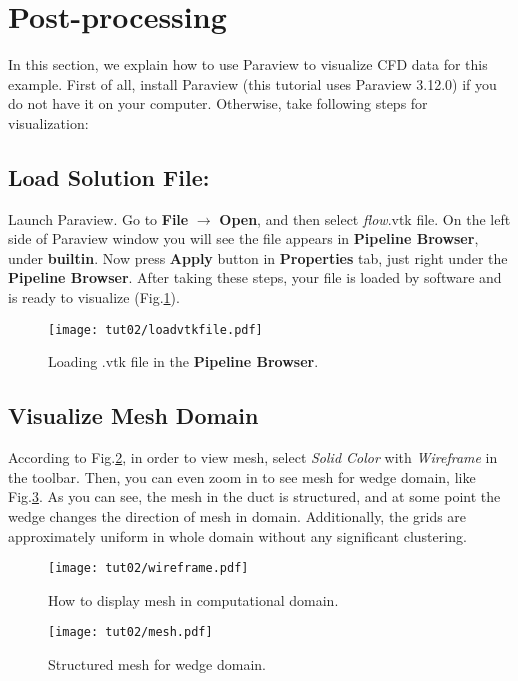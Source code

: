 \section{Post-processing}
In this section, we explain how to use Paraview to visualize CFD data for this example. First of all, install Paraview (this tutorial uses Paraview 3.12.0) if you do not have it on your computer. Otherwise, take following steps for visualization:
\subsection{Load Solution File:}
Launch Paraview. Go to \textbf{File} $\rightarrow$ \textbf{Open}, and then select \textit{flow}.vtk file. On the left side of Paraview window you will see the file appears in \textbf{Pipeline Browser}, under \textbf{builtin}. Now press \textbf{Apply} button in \textbf{Properties} tab, just right under the  \textbf{Pipeline Browser}. After taking these steps, your file is loaded by software and is ready to visualize (Fig.\ref{fig:load}).
\begin{figure}[htbp]
    \centering
    \texttt{[image: tut02/loadvtkfile.pdf]}
    \caption{Loading .vtk file in the \textbf{Pipeline Browser}.}
    \label{fig:load}
\end{figure}
\subsection{Visualize Mesh Domain}
According to Fig.\ref{fig:wireframe}, in order to view mesh, select \textit{Solid Color} with \textit{Wireframe} in the toolbar. Then, you can even zoom in to see mesh for wedge domain, like Fig.\ref{fig:mesh}. As you can see, the mesh in the duct is structured, and at some point the wedge changes the direction of mesh in domain. Additionally, the grids are approximately uniform in whole domain without any significant clustering.
\begin{figure}[htbp]
    \centering
    \texttt{[image: tut02/wireframe.pdf]}
    \caption{How to display mesh in computational domain.}
    \label{fig:wireframe}
\end{figure}
\begin{figure}[htbp]
    \centering
    \texttt{[image: tut02/mesh.pdf]}
    \caption{Structured mesh for wedge domain.}
    \label{fig:mesh}
\end{figure}
